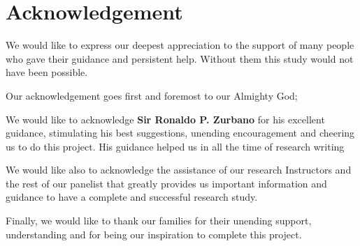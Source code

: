 \section*{\centering Acknowledgement}

We would like to express our deepest appreciation to the support of many people who gave their guidance and persistent help.
Without them this study would not have been possible.

Our acknowledgement goes first and foremost to our Almighty God;

We would like to acknowledge \textbf{Sir Ronaldo P. Zurbano} for his excellent guidance, stimulating his best suggestions, unending encouragement and cheering us to do this project.
His guidance helped us in all the time of research writing

We would like also to acknowledge the assistance of our research Instructors and the rest of our panelist that greatly provides us important information and guidance to have a complete and successful research study.

Finally, we would like to thank our families for their unending support, understanding and for being our inspiration to complete this project.
